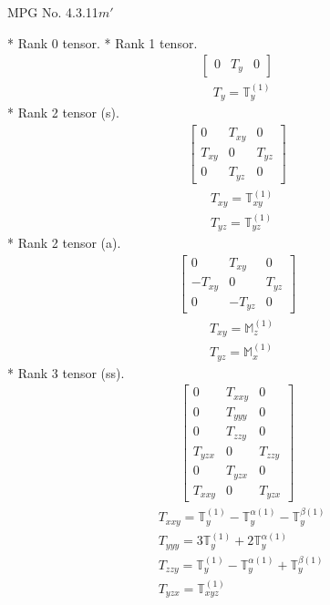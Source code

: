 \documentclass[fleqn,8pt,landscape]{jsarticle}
\begin{document}
\setcounter{MaxMatrixCols}{32}

\renewcommand{\tablename}{Table~}
\renewcommand{\figurename}{Figure~}
\begin{center}
\LARGE
MPG No. 4.3.11\quad$m'$
\end{center}
* Rank 0 tensor.
* Rank 1 tensor.
\begin{align*}
\begin{bmatrix} 0 & T_{y} & 0 \end{bmatrix}
\end{align*}
\begin{align*}
& T_{y} = \mathbb{T}_{y}^{(1)}
\end{align*}
* Rank 2 tensor (s).
\begin{align*}
\begin{bmatrix} 0 & T_{xy} & 0 \\ T_{xy} & 0 & T_{yz} \\ 0 & T_{yz} & 0 \end{bmatrix}
\end{align*}
\begin{align*}
& T_{xy} = \mathbb{T}_{xy}^{(1)} \\
& T_{yz} = \mathbb{T}_{yz}^{(1)}
\end{align*}
* Rank 2 tensor (a).
\begin{align*}
\begin{bmatrix} 0 & T_{xy} & 0 \\ - T_{xy} & 0 & T_{yz} \\ 0 & - T_{yz} & 0 \end{bmatrix}
\end{align*}
\begin{align*}
& T_{xy} = \mathbb{M}_{z}^{(1)} \\
& T_{yz} = \mathbb{M}_{x}^{(1)}
\end{align*}
* Rank 3 tensor (ss).
\begin{align*}
\begin{bmatrix} 0 & T_{xxy} & 0 \\ 0 & T_{yyy} & 0 \\ 0 & T_{zzy} & 0 \\ T_{yzx} & 0 & T_{zzy} \\ 0 & T_{yzx} & 0 \\ T_{xxy} & 0 & T_{yzx} \end{bmatrix}
\end{align*}
\begin{align*}
& T_{xxy} = \mathbb{T}_{y}^{(1)} - \mathbb{T}_{y}^{\alpha(1)} - \mathbb{T}_{y}^{\beta(1)} \\
& T_{yyy} = 3 \mathbb{T}_{y}^{(1)} + 2 \mathbb{T}_{y}^{\alpha(1)} \\
& T_{zzy} = \mathbb{T}_{y}^{(1)} - \mathbb{T}_{y}^{\alpha(1)} + \mathbb{T}_{y}^{\beta(1)} \\
& T_{yzx} = \mathbb{T}_{xyz}^{(1)}
\end{align*}
\end{document}
